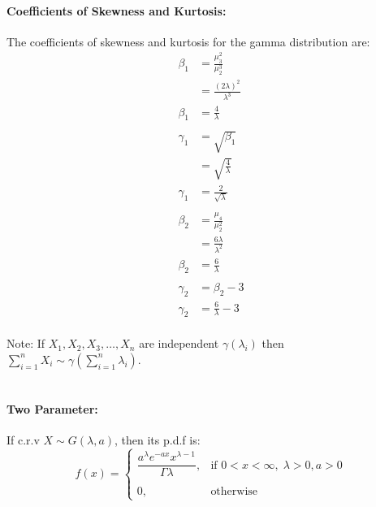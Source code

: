 \documentclass[
10pt, %
a4paper, %
]{report}
\begin{document}
\paragraph{Coefficients of Skewness and Kurtosis:}
The coefficients of skewness and kurtosis for the gamma distribution are:
\begin{align*}
    \beta_1 &= \frac{\mu_3^2}{\mu_2^3} \\
            &= \frac{(2\lambda)^2}{\lambda^3} \\
    \beta_1 &= \frac{4}{\lambda} \\ \\
    \gamma_1 &= \sqrt{\beta_1} \\
             &= \sqrt{\frac{4}{\lambda}} \\
    \gamma_1 &= \frac{2}{\sqrt{\lambda}} \\ \\
    \beta_2 &= \frac{\mu_4}{\mu_2^2} \\
            &= \frac{6\lambda}{\lambda^2} \\
    \beta_2 &= \frac{6}{\lambda} \\ \\
    \gamma_2 &= \beta_2 - 3 \\
    \gamma_2 &= \frac{6}{\lambda} -3 \\
\end{align*}

Note:
If \(X_1, X_2, X_3, \dots, X_n\) are independent \(\gamma(\lambda_i)\) then \(\sum_{i=1}^n X_i \sim \gamma(\sum_{i=1}^n \lambda_i)\).
\\ \\
\paragraph*{Two Parameter:}
If c.r.v \(X\sim G(\lambda, a)\), then its p.d.f is:
\[
    f(x)= 
\begin{cases}
    \dfrac{a^\lambda e^{-ax} x^{\lambda -1}}{\Gamma \lambda}, & \text{if } 0<  x < \infty,\;\lambda >0, a>0\\ \\
    0,                                     & \text{otherwise}
\end{cases}
\]
\end{document}
